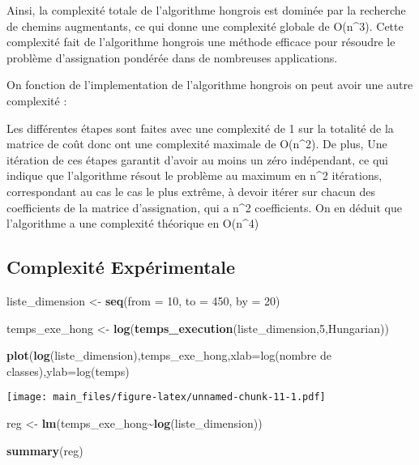 \documentclass[
]{article}
\newenvironment{Shaded}{\begin{snugshade}}{\end{snugshade}}
\newcommand{\AttributeTok}[1]{\textcolor[rgb]{0.13,0.29,0.53}{#1}}
\newcommand{\DecValTok}[1]{\textcolor[rgb]{0.00,0.00,0.81}{#1}}
\newcommand{\FunctionTok}[1]{\textcolor[rgb]{0.13,0.29,0.53}{\textbf{#1}}}
\newcommand{\NormalTok}[1]{#1}
\newcommand{\OtherTok}[1]{\textcolor[rgb]{0.56,0.35,0.01}{#1}}
\newcommand{\SpecialCharTok}[1]{\textcolor[rgb]{0.81,0.36,0.00}{\textbf{#1}}}
\newcommand{\StringTok}[1]{\textcolor[rgb]{0.31,0.60,0.02}{#1}}
\begin{document}
Ainsi, la complexité totale de l'algorithme hongrois est dominée par la
recherche de chemins augmentants, ce qui donne une complexité globale de
O(n\^{}3). Cette complexité fait de l'algorithme hongrois une méthode
efficace pour résoudre le problème d'assignation pondérée dans de
nombreuses applications.

On fonction de l'implementation de l'algorithme hongrois on peut avoir
une autre complexité :

Les différentes étapes sont faites avec une complexité de 1 sur la
totalité de la matrice de coût donc ont une complexité maximale de
O(n\^{}2). De plus, Une itération de ces étapes garantit d'avoir au
moins un zéro indépendant, ce qui indique que l'algorithme résout le
problème au maximum en n\^{}2 itérations, correspondant au cas le cas le
plus extrême, à devoir itérer sur chacun des coefficients de la matrice
d'assignation, qui a n\^{}2 coefficients. On en déduit que l'algorithme
a une complexité théorique en O(n\^{}4)

\hypertarget{complexituxe9-expuxe9rimentale-1}{%
\subsection{Complexité
Expérimentale}\label{complexituxe9-expuxe9rimentale-1}}

\begin{Shaded}
\begin{Highlighting}[]
\NormalTok{liste\_dimension }\OtherTok{\textless{}{-}} \FunctionTok{seq}\NormalTok{(}\AttributeTok{from =} \DecValTok{10}\NormalTok{, }\AttributeTok{to =} \DecValTok{450}\NormalTok{, }\AttributeTok{by =} \DecValTok{20}\NormalTok{)}

\NormalTok{temps\_exe\_hong }\OtherTok{\textless{}{-}} \FunctionTok{log}\NormalTok{(}\FunctionTok{temps\_execution}\NormalTok{(liste\_dimension,}\DecValTok{5}\NormalTok{,Hungarian))}

\FunctionTok{plot}\NormalTok{(}\FunctionTok{log}\NormalTok{(liste\_dimension),temps\_exe\_hong,}\AttributeTok{xlab=}\StringTok{\textquotesingle{}log(nombre de classes)\textquotesingle{}}\NormalTok{,}\AttributeTok{ylab=}\StringTok{\textquotesingle{}log(temps\textquotesingle{}}\NormalTok{)}
\end{Highlighting}
\end{Shaded}

\texttt{[image: main\_files/figure-latex/unnamed-chunk-11-1.pdf]}

\begin{Shaded}
\begin{Highlighting}[]
\NormalTok{reg }\OtherTok{\textless{}{-}} \FunctionTok{lm}\NormalTok{(temps\_exe\_hong}\SpecialCharTok{\textasciitilde{}}\FunctionTok{log}\NormalTok{(liste\_dimension))}

\FunctionTok{summary}\NormalTok{(reg)}
\end{Highlighting}
\end{Shaded}
\end{document}
